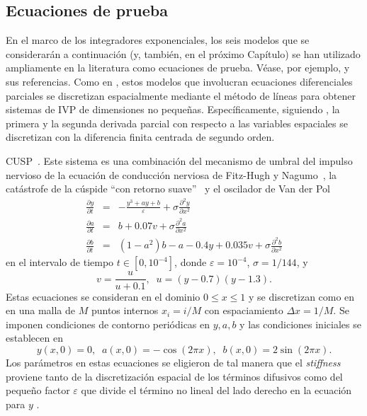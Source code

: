 \subsection{Ecuaciones de prueba}\label{section:test-eq}
En el marco de los integradores exponenciales, los seis modelos que se considerarán a continuación (y, también, en el próximo Capítulo) se han utilizado ampliamente en la literatura como ecuaciones de prueba. Véase, por ejemplo, \cite{tokman2006efficient,tokman2012new,tokman2013comparative} y sus referencias. Como en \cite{tokman2006efficient,tokman2012new,tokman2013comparative}, estos modelos que involucran ecuaciones diferenciales parciales se discretizan espacialmente mediante el método de líneas para obtener sistemas de IVP de dimensiones no pequeñas. Específicamente, siguiendo \cite{tokman2006efficient,tokman2012new,tokman2013comparative}, la primera y la segunda derivada parcial con respecto a las variables espaciales se discretizan con la diferencia finita centrada de segundo orden.

\begin{example}
    \label{ex:cusp} CUSP~\cite{wanner1996solving,tokman2006efficient}. Este sistema es una combinación del mecanismo de umbral del impulso nervioso de la ecuación de conducción nerviosa de Fitz-Hugh y Nagumo~\cite{fitzhugh1969mathematical,nagumo1962active}, la catástrofe de la cúspide ``con retorno suave''~\cite{zeeman1973differential} y el oscilador de Van der Pol
    \begin{eqnarray*}
        \frac{\partial y}{\partial t} &=& -\frac{y^{3}+ay+b}{\varepsilon}+\sigma\frac{\partial^{2}y}{\partial x^{2}}\\
        \frac{\partial a}{\partial t} &=& b+0\mathord{.}07v+\sigma \frac{\partial^{2}a}{\partial x^{2}}\\
        \frac{\partial b}{\partial t} &=& (1-a^{2})b-a-0\mathord{.}4y+0\mathord{.}035v+\sigma\frac{\partial^{2}b}{\partial x^{2}}
    \end{eqnarray*}
    en el intervalo de tiempo $t\in [0,10^{-4}]$, donde $\varepsilon=10^{-4}$, $\sigma=1/144$, y
    \[ v= \frac{u}{u+0\mathord{.}1},\;\; u=(y-0\mathord{.}7)(y-1\mathord{.}3).\]
    Estas ecuaciones se consideran en el dominio $0\leq x\leq 1$ y se discretizan como en \cite{tokman2006efficient} en una malla de $M$ puntos internos $x_i = i/M$ con espaciamiento $\Delta x=1/M$. Se imponen condiciones de contorno periódicas en $y,a,b$ y las condiciones iniciales se establecen en
    \[y(x, 0)=0,\;\;a(x, 0)=-\cos(2\pi x),\;\;b(x, 0)=2\sin(2\pi x).\]
    Los parámetros en estas ecuaciones se eligieron de tal manera que el \textit{stiffness} proviene tanto de la discretización espacial de los términos difusivos como del pequeño factor $\varepsilon$ que divide el término no lineal del lado derecho en la ecuación para $y$ .
\end{example}

